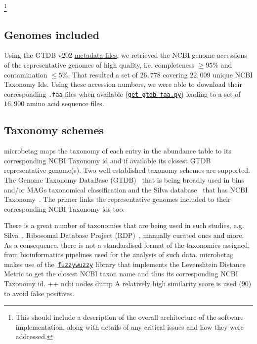 \documentclass[sn-mathphys,Numbered, lineno]{sn-jnl}  %
\theoremstyle{thmstyleone}%
\theoremstyle{thmstyletwo}%
\theoremstyle{thmstylethree}%
\begin{document}
    \footnote{This should include a description of the overall architecture of the software implementation, along with details of any critical issues and how they were addressed.}

    \subsection*{Genomes included}
    \label{subsec:genomes}

        Using the GTDB v202 \href{https://data.gtdb.ecogenomic.org/releases/release202/202.0/}{metadata files}, we retrieved the NCBI genome accessions of the representative genomes of high quality, i.e. completeness $\geq 95\%$  and contamination $\leq 5\%$.
        That resulted a set of $26,778$ covering $22,009$ unique NCBI Taxonomy Ids.
        Using these accession numbers, we were able to download their corresponding \texttt{.faa} files when available (\href{https://github.com/hariszaf/microbetag/blob/develop/microbetagDB/mappings/gtdb_ncbi/get_gtdb_faa.py}{\texttt{get\_gtdb\_faa.py}}) leading to a set of $16,900$ amino acid sequence files.


    \subsection*{Taxonomy schemes}
    \label{subsec:taxonomies}

        microbetag maps the taxonomy of each entry in the abundance table to its corresponding NCBI Taxonomy id and if available its closest GTDB representative genome(s).
        Two well established taxonomy schemes are supported.
        The Genome Taxonomy DataBase (GTDB)~\cite{parks2022gtdb} that is being broadly used in bins and/or MAGs taxonomical classification
        and the Silva database~\cite{quast2012silva} that has 
        NCBI Taxonomy~\cite{schoch2020ncbi}. 
        The primer links the representative genomes included to their corresponding NCBI Taxonomy ids too. 
        
        There is a great number of taxonomies that are being used in such studies, e.g. Silva~\cite{quast2012silva}, Ribosomal Database Project (RDP)~\cite{cole2014ribosomal}, manually curated ones and more, 
        As a consequence, there is not a standardised format of the taxonomies assigned, from bioinformatics pipelines used for the analysis of such data.
        microbetag makes use of the~\href{https://github.com/seatgeek/thefuzz}{\texttt{fuzzywuzzy}} library that implements the Levenshtein Distance Metric to get the closest NCBI taxon name and thus its corresponding NCBI Taxonomy id. 
        ++ ncbi nodes dump
        A relatively high similarity score is used (90) to avoid false positives. 
\end{document}
